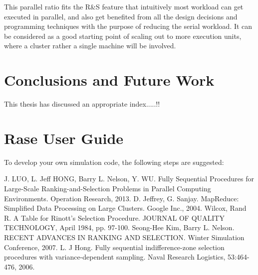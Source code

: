 \documentclass[12pt,a4]{report}
\begin{document}
This parallel ratio fits the R\&S feature that intuitively most workload can get executed in parallel, and also get benefited from all the design decisions and programming techniques with the purpose of reducing the serial workload. It can be considered as a good starting point of scaling out to more execution units, where a cluster rather a single machine will be involved.

\chapter{Conclusions and Future Work}

This thesis has discussed an appropriate index.....!!


\newpage
{}
\appendix


\chapter{Rase User Guide}

To develop your own simulation code, the following steps are suggested:

\newpage
%

%

\begin{thebibliography}{99}
J. LUO, L. Jeff HONG, Barry L. Nelson, Y. WU. Fully Sequential Procedures for Large-Scale Ranking-and-Selection Problems in Parallel Computing Environments. Operation Research, 2013.
D. Jeffrey, G. Sanjay. MapReduce: Simplified Data Processing on Large Clusters. Google Inc., 2004.
Wilcox, Rand R. A Table for Rinott's Selection Procedure. JOURNAL OF QUALITY TECHNOLOGY, April 1984, pp. 97-100.
Seong-Hee Kim, Barry L. Nelson. RECENT ADVANCES IN RANKING AND SELECTION. Winter Simulation Conference, 2007.
L. J Hong. Fully sequential indifference-zone selection procedures with variance-dependent sampling. Naval Research Logistics, 53:464-476, 2006.
\end{thebibliography}
\end{document}
